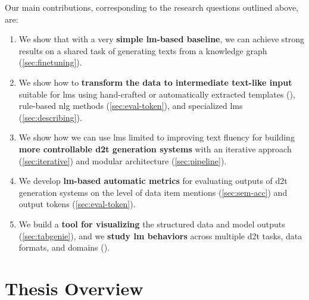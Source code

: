 Our main contributions, corresponding to the research questions outlined above, are:
\begin{enumerate}
    \item We show that with a very \textbf{simple \ac{lm}-based baseline}, we can achieve strong results on a shared task of generating texts from a knowledge graph (\autoref{sec:finetuning}).
    \item We show how to \textbf{transform the data to intermediate text-like input} suitable for \acp{lm} using hand-crafted or automatically extracted templates (), rule-based \ac{nlg} methods (\autoref{sec:eval-token}), and specialized \acp{lm} (\autoref{sec:describing}).
    \item We show how we can use \acp{lm} limited to improving text fluency for building \textbf{more controllable \ac{d2t} generation systems} with an iterative approach (\autoref{sec:iterative}) and modular architecture (\autoref{sec:pipeline}).
    \item We develop \textbf{\ac{lm}-based automatic metrics} for evaluating outputs of \ac{d2t} generation systems on the level of data item mentions (\autoref{sec:sem-acc}) and output tokens (\autoref{sec:eval-token}).
    \item We build a \textbf{tool for visualizing} the structured data and model outputs (\autoref{sec:tabgenie}), and we \textbf{study \ac{lm} behaviors} across multiple \ac{d2t} tasks, data formats, and domains ().
\end{enumerate}



\section{Thesis Overview}
\label{sec:overview}


